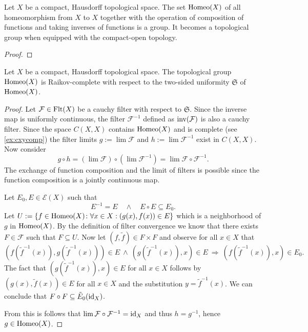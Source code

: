 \begin{ex}
  Let $X$ be a compact, Hausdorff topological space. The set ${\rm Homeo}(X)$ of all homeomorphism from $X$ to $X$ together with the operation of composition of functions and taking inverses of functions is a group. It becomes a topological group when equipped with the compact-open topology.
\end{ex}

\begin{proof}
\end{proof}

\begin{thm}\label{thm:homeocomp}
  Let $X$ be a compact, Hausdorff topological space. The topological group ${\rm Homeo}(X)$ is Raikov-complete with respect to the two-sided uniformity $\mathfrak{S}$ of ${\rm Homeo}(X)$. 
\end{thm}

\begin{proof}
  Let $\mathcal{F} \in {\rm Flt}(X)$ be a cauchy filter with respect to $\mathfrak{S}$. Since the inverse map is uniformly continuous, the filter $\mathcal{F}^{-1}$ defined as ${\rm inv}(\mathcal{F})$ is also a cauchy filter. Since the space $C(X, X)$ contains ${\rm Homeo}(X)$ and is complete (see \ref{ex:cxycomp}) the filter limits $g := \lim \mathcal{F}$ and $h := \lim \mathcal{F}^{-1}$ exist in $C(X,X)$. Now consider $$ g \circ h = (\lim \mathcal{F}) \circ (\lim \mathcal{F}^{-1}) = \lim {\mathcal{F} \circ \mathcal{F}^{-1}}. $$ The exchange of function composition and the limit of filters is possible since the function composition is a jointly continuous map.

  Let $E_0, E \in \mathcal{E}(X)$ such that $$ E^{-1} = E \quad \land \quad E \circ E \subseteq E_0.$$ Let $U := \{f \in {\rm Homeo}(X)\colon \forall x \in X: (g(x), f(x)) \in E\}$ which is a neighborhood of $g$ in ${\rm Homeo}(X)$. By the definition of filter convergence we know that there exists $F \in \mathcal{F}$ such that $F \subseteq U$. Now let $(f, \tilde{f}) \in F \times F$ and observe for all $x \in X$ that $$ \left(f(\tilde{f}^{-1}(x)), g(\tilde{f}^{-1}(x))\right) \in E \: \land \: \left(g(\tilde{f}^{-1}(x)), x\right) \in E \: \Rightarrow \: \left(f(\tilde{f}^{-1}(x)), x\right) \in E_0.$$ The fact that $\left(g(\tilde{f}^{-1}(x)), x\right) \in E$ for all $x \in X$ follows by $\left(g(x), \tilde{f}(x)\right) \in E$ for all $x \in X$ and the substitution $y = \tilde{f}^{-1}(x)$. We can conclude that $F \circ F \subseteq \tilde{E}_0({\rm id}_X)$. 

  From this is follows that $\lim \mathcal{F} \circ \mathcal{F}^{-1} = {\rm id}_X$ and thus $h = g^{-1}$, hence $g \in {\rm Homeo}(X)$.
\end{proof}


